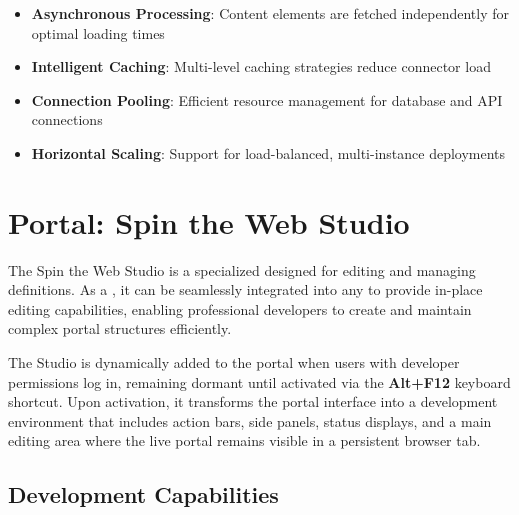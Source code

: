 \begin{itemize}
	\item \textbf{Asynchronous Processing}: Content elements are fetched independently for optimal loading times
	\item \textbf{Intelligent Caching}: Multi-level caching strategies reduce connector load
	\item \textbf{Connection Pooling}: Efficient resource management for database and API connections
	\item \textbf{Horizontal Scaling}: Support for load-balanced, multi-instance deployments
\end{itemize}

\section{Portal: Spin the Web Studio}
\label{sec:workshop-studio}

The Spin the Web Studio is a specialized \webbaselet{} designed for editing and managing \webbase{} definitions. As a \webbaselet{}, it can be seamlessly integrated into any \webbase{} to provide in-place editing capabilities, enabling professional developers to create and maintain complex portal structures efficiently.

The Studio is dynamically added to the portal \webbase{} when users with developer permissions log in, remaining dormant until activated via the \textbf{Alt+F12} keyboard shortcut. Upon activation, it transforms the portal interface into a development environment that includes action bars, side panels, status displays, and a main editing area where the live portal remains visible in a persistent browser tab.

\subsection{Development Capabilities}


